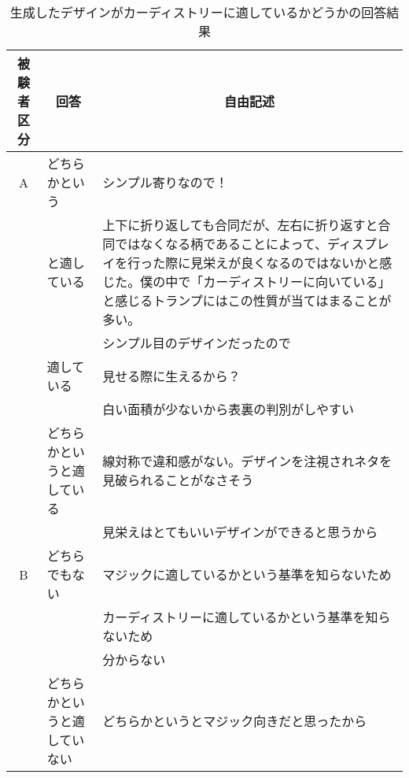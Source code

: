 \begin{table}[htbp]
    \centering    \caption{生成したデザインがカーディストリーに適しているかどうかの回答結果}
    \begin{tabular}{|c|p{7em}|p{26em}|} \hline
        被験者区分 & \multicolumn{1}{|c|}{回答} & \multicolumn{1}{|c|}{自由記述} \\ \hline
         A &どちらかという &シンプル寄りなので！\\\cline{3-3}
         &と適している &上下に折り返しても合同だが、左右に折り返すと合同ではなくなる柄であることによって、ディスプレイを行った際に見栄えが良くなるのではないかと感じた。僕の中で「カーディストリーに向いている」と感じるトランプにはこの性質が当てはまることが多い。\\\cline{3-3}
          & &シンプル目のデザインだったので\\ \hline
          &適している&見せる際に生えるから？\\ \cline{3-3}
          & &白い面積が少ないから表裏の判別がしやすい\\\cline{2-3}
        & どちらかというと適している& 線対称で違和感がない。デザインを注視されネタを見破られることがなさそう \\ \cline{3-3}
        & &見栄えはとてもいいデザインができると思うから\\ \cline{2-3}
       B  & どちらでもない&   マジックに適しているかという基準を知らないため \\\cline{3-3}
         & &カーディストリーに適しているかという基準を知らないため\\\cline{3-3}
        & & 分からない \\\cline{2-3}
       & どちらかというと適していない&どちらかというとマジック向きだと思ったから\\ \hline

    \end{tabular}
    \label{free1}
\end{table}



